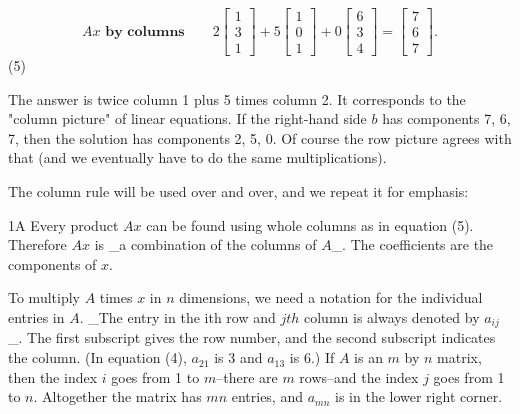 \[Ax\textbf{ by columns}\qquad 2\begin{bmatrix}1\\ 3\\ 1\end{bmatrix}+5\begin{bmatrix}1\\ 0\\ 1\end{bmatrix}+0\begin{bmatrix}6\\ 3\\ 4\end{bmatrix}=\begin{bmatrix}7\\ 6\\ 7\end{bmatrix}.\] (5)

The answer is twice column 1 plus 5 times column 2. It corresponds to the "column picture" of linear equations. If the right-hand side \(b\) has components 7, 6, 7, then the solution has components 2, 5, 0. Of course the row picture agrees with that (and we eventually have to do the same multiplications).

The column rule will be used over and over, and we repeat it for emphasis:

1A Every product \(Ax\) can be found using whole columns as in equation (5). Therefore \(Ax\) is _a combination of the columns of \(A\)_. The coefficients are the components of \(x\).

To multiply \(A\) times \(x\) in \(n\) dimensions, we need a notation for the individual entries in \(A\). _The entry in the ith row and \(jth\) column is always denoted by \(a_{ij}\)_. The first subscript gives the row number, and the second subscript indicates the column. (In equation (4), \(a_{21}\) is 3 and \(a_{13}\) is 6.) If \(A\) is an \(m\) by \(n\) matrix, then the index \(i\) goes from 1 to \(m\)--there are \(m\) rows--and the index \(j\) goes from 1 to \(n\). Altogether the matrix has \(mn\) entries, and \(a_{mn}\) is in the lower right corner.

 